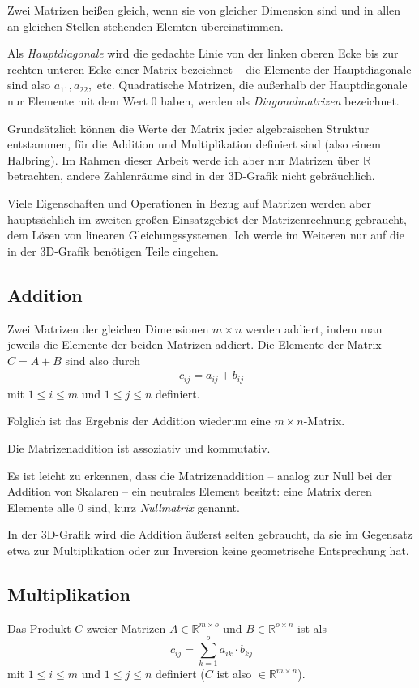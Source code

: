 Zwei Matrizen heißen gleich, wenn sie von gleicher Dimension sind und in allen an gleichen Stellen stehenden Elemten übereinstimmen. 

Als \emph{Hauptdiagonale} wird die gedachte Linie von der linken oberen Ecke bis zur rechten unteren Ecke einer Matrix bezeichnet -- die Elemente der Hauptdiagonale sind also $a_{11}, a_{22},$ etc. Quadratische Matrizen, die außerhalb der Hauptdiagonale nur Elemente mit dem Wert $0$ haben, werden als \emph{Diagonalmatrizen} bezeichnet.

Grundsätzlich können die Werte der Matrix jeder algebraischen Struktur entstammen, für die Addition und Multiplikation definiert sind (also einem Halbring). Im Rahmen dieser Arbeit werde ich aber nur Matrizen über $\mathbb R$ betrachten, andere Zahlenräume sind in der 3D-Grafik nicht gebräuchlich.

Viele Eigenschaften und Operationen in Bezug auf Matrizen werden aber hauptsächlich im zweiten großen Einsatzgebiet der Matrizenrechnung gebraucht, dem Lösen von linearen Gleichungssystemen. Ich werde im Weiteren nur auf die in der 3D-Grafik benötigen Teile eingehen.

\subsection{Addition}
Zwei Matrizen der gleichen Dimensionen $m \times n$ werden addiert, indem man jeweils die Elemente der beiden Matrizen addiert. Die Elemente der Matrix $C = A + B$ sind also durch
\begin{align}
 c_{ij} = a_{ij} + b_{ij}
\end{align}
mit $1 \leq i \leq m$ und $1 \leq j \leq n$ definiert.

Folglich ist das Ergebnis der Addition wiederum eine $m \times n$-Matrix.

Die Matrizenaddition ist assoziativ und kommutativ. 

Es ist leicht zu erkennen, dass die Matrizenaddition -- analog zur Null bei der Addition von Skalaren -- ein neutrales Element besitzt: eine Matrix deren Elemente alle $0$ sind, kurz \emph{Nullmatrix} genannt.

In der 3D-Grafik wird die Addition äußerst selten gebraucht, da sie im Gegensatz etwa zur Multiplikation oder zur Inversion keine geometrische Entsprechung hat.

\subsection{Multiplikation}
Das Produkt $C$ zweier Matrizen $A \in \mathbb{R}^{m \times o}$ und $B \in \mathbb{R}^{o \times n}$ ist als
\begin{equation}
 c_{ij} = \sum_{k=1}^o{a_{ik} \cdot b_{kj}}
\end{equation}
mit $1 \leq i \leq m$ und $1 \leq j \leq n$ definiert ($C$ ist also $\in \mathbb{R}^{m \times n}$).

